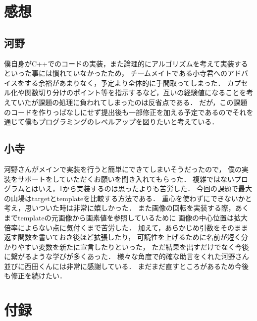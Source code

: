 \documentclass[platex,dvipdfmx]{jsarticle}
\begin{document}
\newpage

\section{感想}
\subsection{河野}
僕自身がC++でのコードの実装，また論理的にアルゴリズムを考えて実装するといった事には慣れていなかったため，
チームメイトである小寺君へのアドバイスをする余裕があまりなく，予定より全体的に手間取ってしまった．
カプセル化や関数切り分けのポイント等を指示するなど，互いの経験値になることを考えていたが課題の処理に負われてしまったのは反省点である．
だが，この課題のコードを作りっぱなしにせず提出後も一部修正を加える予定であるのでそれを通じて僕もプログラミングのレベルアップを図りたいと考えている．

\subsection{小寺}
河野さんがメインで実装を行うと簡単にできてしまいそうだったので，
僕の実装をサポートをしていただくお願いを聞き入れてもらった．
複雑ではないプログラムとはいえ，1から実装するのは思ったよりも苦労した．
今回の課題で最大の山場はtargetとtemplateを比較する方法である．
重心を使わずにできないかと考え，思いついた時は非常に嬉しかった．
また画像の回転を実装する際，あくまでtemplateの元画像から画素値を参照しているために
画像の中心位置は拡大倍率によらない点に気付くまで苦労した．
加えて，あらかじめ引数をそのまま返す関数を書いておき後ほど拡張したり，
可読性を上げるために名前が短く分かりやすい変数を新たに宣言したりといった，
ただ結果を出すだけでなく今後に繋がるような学びが多くあった．
様々な角度で的確な助言をくれた河野さん並びに西田くんには非常に感謝している．
まだまだ直すところがあるため今後も修正を続けたい．


\section*{付録}

\end{document}
